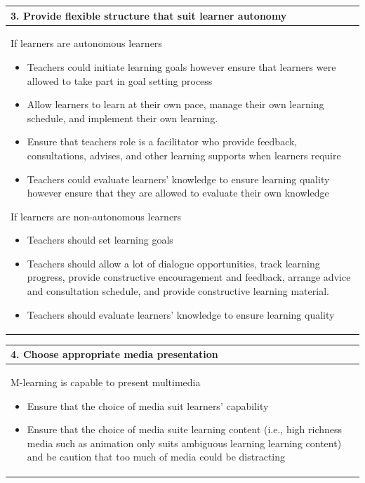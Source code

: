 \newpage

\begin{table}[!htb]
\centering
\begin{tabular}{ |p{13 cm}|} 
\hline 
\textbf{3. Provide flexible structure that suit learner autonomy}\\
\hline 
If learners are autonomous learners 
\begin{itemize} 
\item Teachers could initiate learning goals however ensure that learners were allowed to take part in goal setting process
\item Allow learners to learn at their own pace, manage their own learning schedule, and implement their own learning. 
\item Ensure that teachers role is a facilitator who provide feedback, consultations, advises, and other learning supports when learners require
\item Teachers could evaluate learners' knowledge to ensure learning quality however ensure that they are allowed to evaluate their own knowledge 
\end{itemize}
If learners are non-autonomous learners 
\begin{itemize} 
\item Teachers should set learning goals 
\item Teachers should allow a lot of dialogue opportunities, track learning progress, provide constructive encouragement and feedback, arrange advice and consultation schedule, and provide constructive learning material. 
\item Teachers should evaluate learners' knowledge to ensure learning quality
\end{itemize}\\
\hline 
\end{tabular}
\end{table}

\newpage 

\begin{table}[!htb]
\centering
\begin{tabular}{ |p{13 cm}|} 
\hline
\textbf{4. Choose appropriate media presentation}\\
\hline 
M-learning is capable to present multimedia
\begin{itemize} 
\item Ensure that the choice of media suit learners' capability 
\item Ensure that the choice of media suite learning content (i.e., high richness media such as animation only suits ambiguous learning learning content) and be caution that too much of media could be distracting 
\end{itemize} \\
\hline
\end{tabular}
\end{table}


